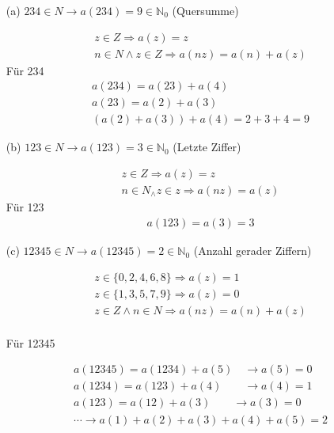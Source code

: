 \begin{itemize}
  \item[(a)] $234 \in N \rightarrow a(234)=9 \in \mathbb{N}_{0}$ (Quersumme)

$$
\begin{aligned}
& z \in Z \Rightarrow a(z)=z \\
& n \in N \wedge z \in Z \Rightarrow a(n z)=a(n)+a(z)
\end{aligned}
$$
Für 234
$$
\begin{aligned}
& a(234)=a(23)+a(4) \\
& a(23)=a(2)+a(3) \\
&(a(2)+a(3))+a(4)=2+3+4=9
\end{aligned}
$$

  \item[(b)] $123 \in N \rightarrow a(123)=3 \in \mathbb{N}_{0}$ (Letzte Ziffer)

  $$
  \begin{aligned}
  &z \in Z \Rightarrow a(z)=z\\
  &n \in N_{\wedge} z \in z \Rightarrow a(n z)=a(z)
  \end{aligned}
  $$
  Für 123
  $$
  \begin{aligned}
  &a(123)=a(3)=3
\end{aligned}
$$

  \item[(c)] $12345 \in N \rightarrow a(12345)=2 \in \mathbb{N}_{0}$ (Anzahl gerader Ziffern)
  
  $$
\begin{aligned}
& z \in\{0,2,4,6,8\} \Rightarrow a(z)=1 \\
& z \in\{1,3,5,7,9\} \Rightarrow a(z)=0 \\
& z \in Z \land n \in N \Rightarrow a(n z)=a(n)+a(z) \\
\end{aligned}
$$

Für 12345

$$
\begin{aligned}
& a(12345)=a(1234)+a(5) \quad \rightarrow a(5)=0 \\
& a(1234)=a(123)+a(4) \quad\quad \rightarrow a(4)=1 \\
& a(123)=a(12)+a(3) \quad\quad \rightarrow a(3)=0 \\
& \cdots \rightarrow a(1)+a(2)+a(3)+a(4)+a(5)=2
\end{aligned}
$$

\end{itemize}

\newpage

